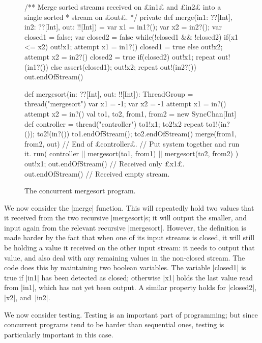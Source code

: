 \begin{figure}
\begin{scala}
  /** Merge sorted streams received on £in1£ and £in2£ into a single sorted
    * stream on £out£. */
  private def merge(in1: ??[Int], in2: ??[Int], out: !![Int]) = {
    var x1 = in1?(); var x2 = in2?(); var closed1 = false; var closed2 = false
    while(!closed1 && !closed2){
      if(x1 <= x2){ out!x1; attempt{ x1 = in1?() }{ closed1 = true } }
      else{ out!x2; attempt{ x2 = in2?() }{ closed2 = true } }
    }
    if(closed2){ out!x1; repeat{ out!(in1?()) } }
    else{ assert(closed1); out!x2; repeat{ out!(in2?()) } }
    out.endOfStream()
  }

  def mergesort(in: ??[Int], out: !![Int]): ThreadGroup = thread("mergesort"){
    var x1 = -1; var x2 = -1
    attempt{ 
      x1 = in?()
      attempt{
        x2 = in?()
        val to1, to2, from1, from2 = new SyncChan[Int]
        def controller = thread("controller"){
          to1!x1; to2!x2
          repeat{ to1!(in?()); to2!(in?()) }
          to1.endOfStream(); to2.endOfStream()
          merge(from1, from2, out)
        } // End of £controller£.
        // Put system together and run it.
        run( controller || mergesort(to1, from1) || mergesort(to2, from2) )
      }{ out!x1; out.endOfStream() } // Received only £x1£.
    }{ out.endOfStream() } // Received empty stream.
  }
\end{scala}
\caption{The concurrent mergesort program.}
\label{fig:mergesort}
\end{figure}


We now consider the |merge| function.  This will repeatedly hold two values
that it received from the two recursive |mergesort|s; it will output the
smaller, and input again from the relevant recursive |mergesort|.  However,
the definition is made harder by the fact that when one of its input streams
is closed, it will still be holding a value it received on the other input
stream: it needs to output that value, and also deal with any remaining values
in the non-closed stream.  The code does this by maintaining two boolean
variables.  The variable |closed1| is true if |in1| has been detected as
closed; otherwise |x1| holds the last value read from |in1|, which has not yet
been output.  A similar property holds for |closed2|, |x2|, and~|in2|.


We now consider testing.  Testing is an important part of programming; but
since concurrent programs tend to be harder than sequential ones, testing is
particularly important in this case.

